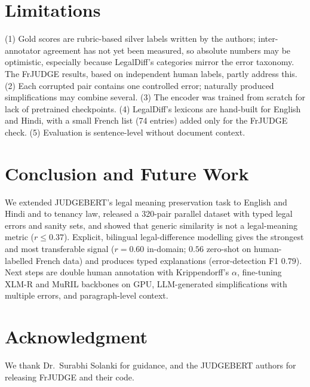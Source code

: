 \section{Limitations}\label{sec:limits}
(1) Gold scores are rubric-based silver labels written by the authors; inter-annotator agreement has not yet been measured, so absolute numbers may be optimistic, especially because LegalDiff's categories mirror the error taxonomy. The FrJUDGE results, based on independent human labels, partly address this. (2) Each corrupted pair contains one controlled error; naturally produced simplifications may combine several. (3) The encoder was trained from scratch for lack of pretrained checkpoints. (4) LegalDiff's lexicons are hand-built for English and Hindi, with a small French list (74 entries) added only for the FrJUDGE check. (5) Evaluation is sentence-level without document context.

\section{Conclusion and Future Work}
We extended JUDGEBERT's legal meaning preservation task to English and Hindi and to tenancy law, released a 320-pair parallel dataset with typed legal errors and sanity sets, and showed that generic similarity is not a legal-meaning metric ($r\le0.37$). Explicit, bilingual legal-difference modelling gives the strongest and most transferable signal ($r=0.60$ in-domain; $0.56$ zero-shot on human-labelled French data) and produces typed explanations (error-detection F1 $0.79$). Next steps are double human annotation with Krippendorff's $\alpha$, fine-tuning XLM-R and MuRIL backbones on GPU, LLM-generated simplifications with multiple errors, and paragraph-level context.

\section*{Acknowledgment}
We thank Dr.\ Surabhi Solanki for guidance, and the JUDGEBERT authors for releasing FrJUDGE and their code.
